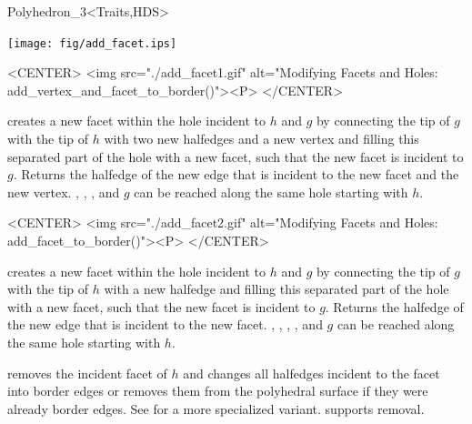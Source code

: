 \begin{ccClassTemplate}{Polyhedron_3<Traits,HDS>}
\begin{ccTexOnly}
    \begin{center}
      \parbox{\textwidth}{%
          \texttt{[image: fig/add\_facet.ips]}%
      }
    \end{center}
\end{ccTexOnly}

\begin{ccHtmlOnly}
    <CENTER>
    <img src="./add_facet1.gif" 
     alt="Modifying Facets and Holes: add_vertex_and_facet_to_border()"><P>
    </CENTER>
\end{ccHtmlOnly}


   {creates a new facet within the hole incident to $h$
   and $g$ by connecting the tip of $g$ with the tip of $h$ 
   with two new halfedges and a new vertex and filling this separated
   part of the hole with a new facet, such that the new facet is
   incident to $g$. Returns the halfedge of the new edge that is
   incident to the new facet and the new vertex.
    \ccPrecond {}, , , 
    and $g$ can be reached along the same hole starting with $h$.}

\begin{ccHtmlOnly}
    <CENTER>
    <img src="./add_facet2.gif" 
     alt="Modifying Facets and Holes: add_facet_to_border()"><P>
    </CENTER>
\end{ccHtmlOnly}

   {creates a new facet within the hole incident to $h$
   and $g$ by connecting the tip of $g$ with the tip of $h$ 
   with a new halfedge and filling this separated part
   of the hole with a new facet, such that the new
   facet is incident to $g$. Returns the halfedge of the new edge that
   is incident to the new facet.
   \ccPrecond {}, , , 
   , and $g$ can be reached along the same hole
   starting with $h$.}



    {removes the incident facet of $h$ and changes all halfedges incident 
     to the facet into border edges or removes them from the
     polyhedral surface if they were already border edges.
     See  for a more specialized variant.    
     \ccPrecond {} supports removal.}


\end{ccClassTemplate}
